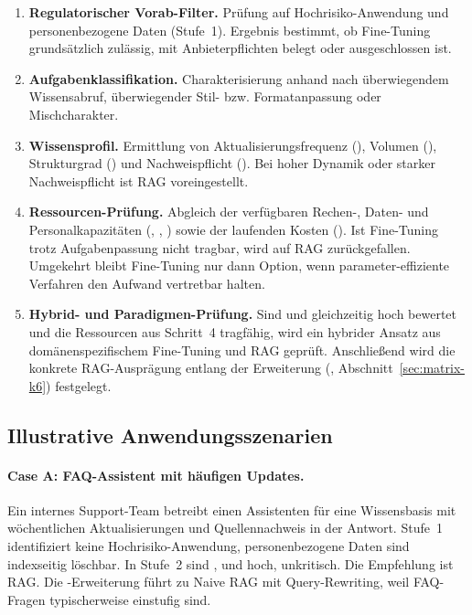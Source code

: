 \begin{enumerate}
  \item \textbf{Regulatorischer Vorab-Filter.} Prüfung auf Hochrisiko-Anwendung und personenbezogene Daten (Stufe~1). Ergebnis bestimmt, ob Fine-Tuning grundsätzlich zulässig, mit Anbieterpflichten belegt oder ausgeschlossen ist.
  \item \textbf{Aufgabenklassifikation.} Charakterisierung anhand  nach überwiegendem Wissensabruf, überwiegender Stil- bzw. Formatanpassung oder Mischcharakter.
  \item \textbf{Wissensprofil.} Ermittlung von Aktualisierungsfrequenz (), Volumen (), Strukturgrad () und Nachweispflicht (). Bei hoher Dynamik oder starker Nachweispflicht ist RAG voreingestellt.
  \item \textbf{Ressourcen-Prüfung.} Abgleich der verfügbaren Rechen-, Daten- und Personalkapazitäten (, , ) sowie der laufenden Kosten (). Ist Fine-Tuning trotz Aufgabenpassung nicht tragbar, wird auf RAG zurückgefallen. Umgekehrt bleibt Fine-Tuning nur dann Option, wenn parameter-effiziente Verfahren den Aufwand vertretbar halten.
  \item \textbf{Hybrid- und Paradigmen-Prüfung.} Sind  und  gleichzeitig hoch bewertet und die Ressourcen aus Schritt~4 tragfähig, wird ein hybrider Ansatz aus domänenspezifischem Fine-Tuning und RAG geprüft. Anschließend wird die konkrete RAG-Ausprägung entlang der Erweiterung (, Abschnitt~\ref{sec:matrix-k6}) festgelegt.
\end{enumerate}

\subsection{Illustrative Anwendungsszenarien}
\label{sec:cases}

\paragraph{Case A: FAQ-Assistent mit häufigen Updates.}
Ein internes Support-Team betreibt einen Assistenten für eine Wissensbasis mit wöchentlichen Aktualisierungen und Quellennachweis in der Antwort. Stufe~1 identifiziert keine Hochrisiko-Anwendung, personenbezogene Daten sind indexseitig löschbar. In Stufe~2 sind ,  und  hoch,  unkritisch. Die Empfehlung ist RAG. Die -Erweiterung führt zu Naive RAG mit Query-Rewriting, weil FAQ-Fragen typischerweise einstufig sind.

